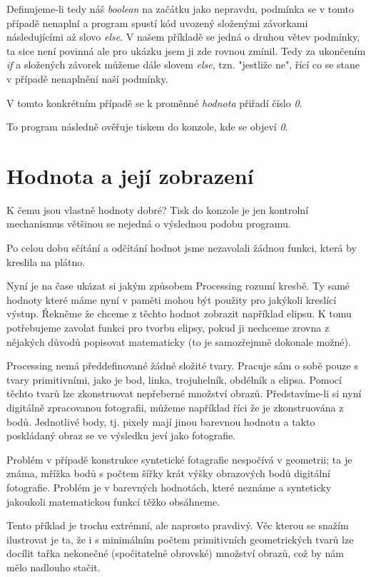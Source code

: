\documentclass[11pt]{article} %
\begin{document}
Definujeme-li tedy náš {\em boolean} na začátku jako nepravdu, podmínka se v tomto případě nenaplní a program spustí kód uvozený složenými závorkami následujícími až slovo {\em else}.
V našem příkladě se jedná o druhou větev podmínky, ta sice není povinná ale pro ukázku jsem ji zde rovnou zmínil. Tedy za ukončením {\em if} a složených závorek můžeme dále slovem {\em else}, tzn. "jestliže ne", řící co se stane v případě nenaplnění naší podmínky.

V tomto konkrétním případě se k proměnné {\em hodnota} přiřadí číslo {\em 0}.

To program následně ověřuje tiskem do konzole, kde se objeví {\em 0}.

\section{Hodnota a její zobrazení}

K čemu jsou vlastně hodnoty dobré? Tisk do konzole je jen kontrolní mechanismus většinou se nejedná o výslednou podobu programu.

Po celou dobu sčítání a odčítání hodnot jsme nezavolali žádnou funkci, která by kreslila na plátno.

Nyní je na čase ukázat si jakým způsobem Processing rozumí kresbě. Ty samé hodnoty které máme nyní v paměti mohou být použity pro jakýkoli kreslící výstup. Řekněme že chceme z těchto hodnot zobrazit například elipsu. K tomu potřebujeme zavolat funkci pro tvorbu elipsy, pokud ji nechceme zrovna z nějakých důvodů popisovat matematicky (to je samozřejmně dokonale možné).

Processing nemá předdefinované žádné složité tvary. Pracuje sám o sobě pouze s tvary primitivními, jako je bod, linka, trojuhelník, obdélník a elipsa. Pomocí těchto tvarů lze zkonstruovat nepřeberné množství obrazů. Představíme-li si nyní digitálně zpracovanou fotografii, můžeme například říci že je zkonstruována z bodů. Jednotlivé body, tj. pixely mají jinou barevnou hodnotu a takto poskládaný obraz se ve výsledku jeví jako fotografie.

Problém v případě konstrukce syntetické fotagrafie nespočívá v geometrii; ta je známa, mřížka bodů s počtem šířky krát výšky obrazových bodů digitální fotografie. Problém je v barevných hodnotách, které neznáme a synteticky jakoukoli matematickou funkcí těžko obsáhneme.

Tento příklad je trochu extrémní, ale naprosto pravdivý. Věc kterou se snažím ilustrovat je ta, že i s minimálním počtem primitivních geometrických tvarů lze docílit tařka nekonečné (spočitatelně obrovské) množství obrazů, což by nám mělo nadlouho stačit.
\end{document}
